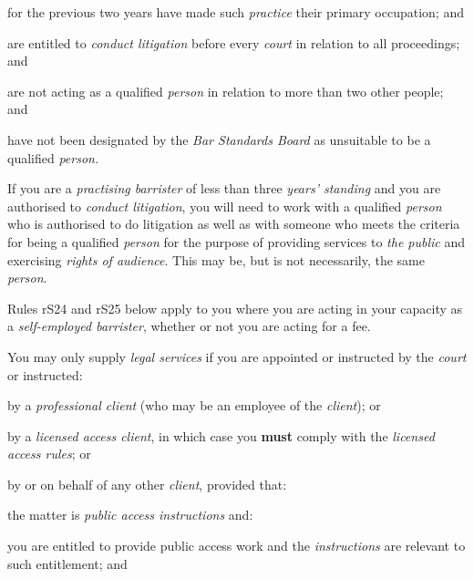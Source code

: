 \item for the previous two years have made such \emph{practice} their
primary occupation; and

\item are entitled to \emph{conduct litigation} before every \emph{court}
in relation to all proceedings; and

\item are not acting as a qualified \emph{person} in relation to more than
two other people; and

\item have not been designated by the \emph{Bar Standards Board} as
unsuitable to be a qualified \emph{person.}\lr\la\ln




If you are a \emph{practising barrister} of less than three \emph{years'
standing} and you are authorised to \emph{conduct litigation}, you will
need to work with a qualified \emph{person} who is authorised to do
litigation as well as with someone who meets the criteria for being a
qualified \emph{person} for the purpose of providing services to
\emph{the public} and exercising \emph{rights of audience}. This may be,
but is not necessarily, the same \emph{person}.




Rules rS24 and rS25 below apply to you where you are acting in your
capacity as a \emph{self-employed barrister}, whether or not you are
acting for a fee.


You may only supply \emph{legal services} if you are appointed or
instructed by the \emph{court} or instructed:\nl\item by a \emph{professional client} (who may be an employee of the
\emph{client}); or
\item by a \emph{licensed access client}, in which case you \textcolor{myred}{\textbf{must }}comply
with the \emph{licensed access rules}; or
\item by or on behalf of any other \emph{client}, provided that:
\al\item the matter is \emph{public access instructions} and:
\rl\item you are entitled to provide public access work and the
\emph{instructions} are relevant to such entitlement; and

